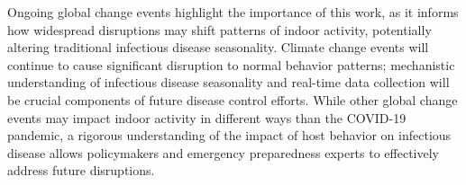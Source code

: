 \documentclass{article}
\begin{document}

Ongoing global change events highlight the importance of this work, as it informs how widespread disruptions may shift patterns of indoor activity, potentially altering traditional infectious disease seasonality. 
Climate change events will continue to cause significant disruption to normal behavior patterns; mechanistic understanding of infectious disease seasonality and real-time data collection will be crucial components of future disease control efforts. While other global change events may impact indoor activity in different ways than the COVID-19 pandemic, a rigorous understanding of the impact of host behavior on infectious disease allows policymakers and emergency preparedness experts to effectively address future disruptions.

\end{document}
